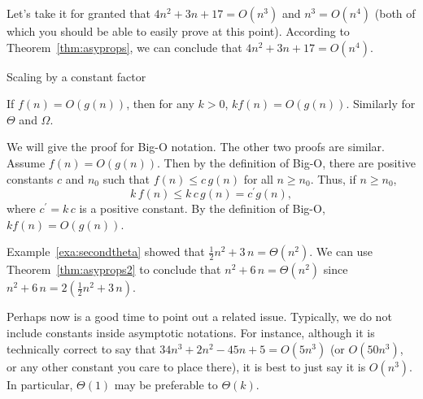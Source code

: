   
\begin{exa}
Let's take it for granted that $4n^2+3n+17=O(n^3)$ and $n^3=O(n^4)$
(both of which you should be able to easily prove at this point).
According to Theorem~\ref{thm:asyprops}, we can conclude that $4n^2+3n+17=O(n^4)$.
\end{exa}

\begin{thm}\label{thm:asyprops2}
Scaling by a constant factor

\noindent
If $f(n)= O(g(n))$, then for any $k > 0$, $k f(n) = O(g(n))$.
Similarly for $\Theta$ and $\Omega$.
\begin{pf}
We will give the proof for Big-O notation.  
The other two proofs are similar.
Assume $f(n)= O(g(n))$.  Then by the definition of Big-O, there are positive constants $c$ and
$n_0$ such that $f(n)\leq c\,g(n)$ for all $n\geq n_0$.
Thus, if $n\geq n_0$, 
$$k\,f(n)\leq k\,c\,g(n)=c^{\prime}g(n),$$
where $c^{\prime}=k\,c$ is a positive constant.
By the definition of Big-O, $k f(n) = O(g(n))$.
\end{pf}
\end{thm}

\begin{exa}
Example~\ref{exa:secondtheta} showed that $\frac{1}{2} n^{2} + 3\,n=\Theta(n^{2})$.
We can use Theorem~\ref{thm:asyprops2} to conclude that 
$n^{2} + 6\,n=\Theta(n^{2})$ since $n^{2} + 6\,n=2\left(\frac{1}{2} n^{2} + 3\,n\right).$
\end{exa}

Perhaps now is a good time to point out a related issue.  Typically, we do not
include constants inside asymptotic notations.  For instance, although it is technically
correct to say that $34n^3+2n^2-45n+5=O(5n^3)$ (or $O(50n^3)$, or any other constant
you care to place there), it is best to just say it is $O(n^3)$.  
In particular, $\Theta(1)$ may be preferable to $\Theta(k)$.

